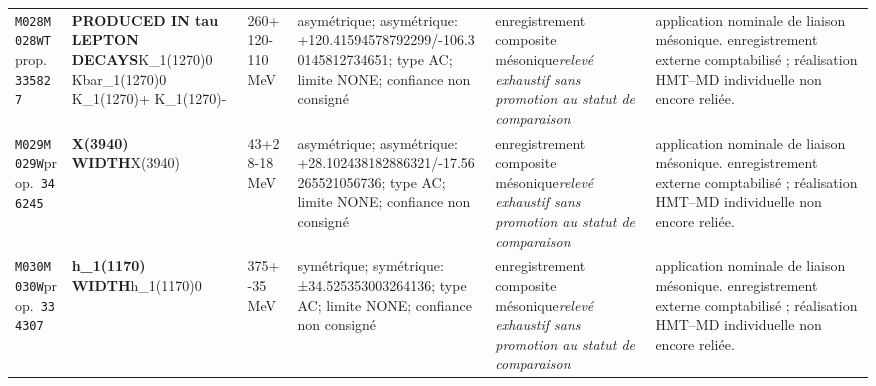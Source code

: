 \begin{landscape}
\begin{longtable}{L{1.85cm}L{4.45cm}L{2.35cm}L{4.05cm}L{3.35cm}L{7.15cm}}
\texttt{M028}\newline \texttt{M028WT}\newline prop.\ \texttt{335827} & \textbf{PRODUCED IN tau LEPTON DECAYS}\newline K\_\allowbreak{}1(1270)0 \textbar{}\allowbreak{} Kbar\_\allowbreak{}1(1270)0 \textbar{}\allowbreak{} K\_\allowbreak{}1(1270)+ \textbar{}\allowbreak{} K\_\allowbreak{}1(1270)- & 260+120-110\,MeV & asymétrique; asymétrique: +120.41594578792299/-106.30145812734651; type AC; limite NONE; confiance non consigné & enregistrement composite mésonique\newline \emph{relevé exhaustif sans promotion au statut de comparaison} & application nominale de liaison mésonique. enregistrement externe comptabilisé ; réalisation HMT--MD individuelle non encore reliée. \\
\texttt{M029}\newline \texttt{M029W}\newline prop.\ \texttt{346245} & \textbf{X(3940) WIDTH}\newline X(3940) & 43+28-18\,MeV & asymétrique; asymétrique: +28.102438182886321/-17.56265521056736; type AC; limite NONE; confiance non consigné & enregistrement composite mésonique\newline \emph{relevé exhaustif sans promotion au statut de comparaison} & application nominale de liaison mésonique. enregistrement externe comptabilisé ; réalisation HMT--MD individuelle non encore reliée. \\
\texttt{M030}\newline \texttt{M030W}\newline prop.\ \texttt{334307} & \textbf{h\_\allowbreak{}1(1170) WIDTH}\newline h\_\allowbreak{}1(1170)0 & 375+-35\,MeV & symétrique; symétrique: ±34.525353003264136; type AC; limite NONE; confiance non consigné & enregistrement composite mésonique\newline \emph{relevé exhaustif sans promotion au statut de comparaison} & application nominale de liaison mésonique. enregistrement externe comptabilisé ; réalisation HMT--MD individuelle non encore reliée. \\

\end{longtable}
\end{landscape}
